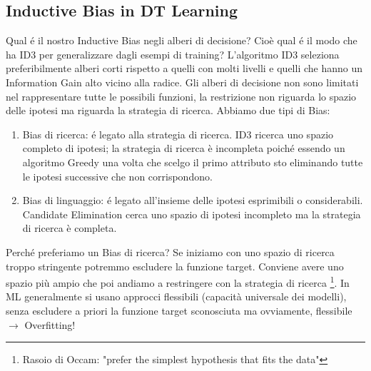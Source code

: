 \documentclass{article}
\begin{document}
\subsection{Inductive Bias in DT Learning}
Qual é il nostro Inductive Bias negli alberi di decisione? Cioè qual é il modo che ha ID3 per generalizzare dagli esempi di training? \newline
L'algoritmo ID3 seleziona preferibilmente alberi corti rispetto a quelli con molti livelli e quelli che hanno un Information Gain alto vicino alla radice. Gli alberi di decisione non sono limitati nel rappresentare tutte le possibili funzioni, la restrizione non riguarda lo spazio delle ipotesi ma riguarda la strategia di ricerca. \newline
Abbiamo due tipi di Bias:
\begin{enumerate}
    \item Bias di ricerca: é legato alla strategia di ricerca. ID3 ricerca uno spazio completo di ipotesi; la strategia di ricerca è incompleta poiché essendo un algoritmo Greedy una volta che scelgo il primo attributo sto eliminando tutte le ipotesi successive che non corrispondono.
    \item Bias di linguaggio: é legato all'insieme delle ipotesi esprimibili o considerabili. Candidate Elimination cerca uno spazio di ipotesi incompleto ma la strategia di ricerca è completa.
\end{enumerate}
Perché preferiamo un Bias di ricerca? Se iniziamo con uno spazio di ricerca troppo stringente potremmo escludere la funzione target. Conviene avere uno spazio più ampio che poi andiamo a restringere con la strategia di ricerca \footnote{Rasoio di Occam: "prefer the simplest hypothesis that fits the data"}. In ML generalmente si usano approcci flessibili (capacità universale dei modelli), senza escludere a priori la funzione target sconosciuta ma ovviamente, flessibile $\rightarrow$ Overfitting!
\end{document}
